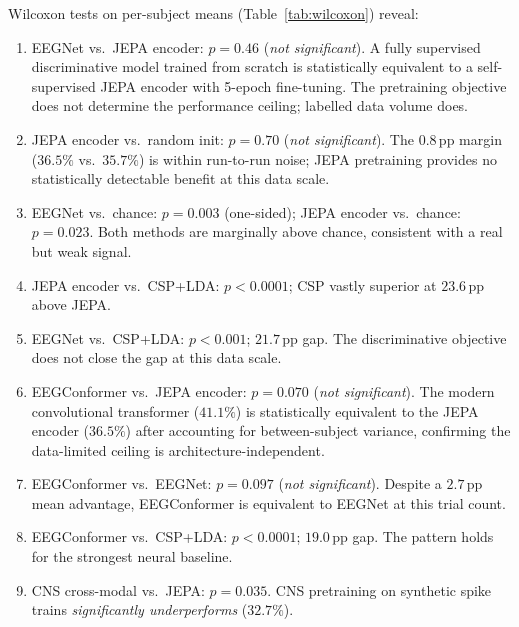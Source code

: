 \documentclass[journal]{IEEEtran}
\begin{document}
Wilcoxon tests on per-subject means (Table~\ref{tab:wilcoxon}) reveal:
\begin{enumerate}
  \item EEGNet vs.\ JEPA encoder: $p = 0.46$ (\emph{not significant}). A fully supervised discriminative model trained from scratch is statistically equivalent to a self-supervised JEPA encoder with 5-epoch fine-tuning. The pretraining objective does not determine the performance ceiling; labelled data volume does.
  \item JEPA encoder vs.\ random init: $p = 0.70$ (\emph{not significant}). The 0.8\,pp margin ($36.5\%$ vs.\ $35.7\%$) is within run-to-run noise; JEPA pretraining provides no statistically detectable benefit at this data scale.
  \item EEGNet vs.\ chance: $p = 0.003$ (one-sided); JEPA encoder vs.\ chance: $p = 0.023$. Both methods are marginally above chance, consistent with a real but weak signal.
  \item JEPA encoder vs.\ CSP+LDA: $p < 0.0001$; CSP vastly superior at $23.6$\,pp above JEPA.
  \item EEGNet vs.\ CSP+LDA: $p < 0.001$; $21.7$\,pp gap. The discriminative objective does not close the gap at this data scale.
  \item EEGConformer vs.\ JEPA encoder: $p = 0.070$ (\emph{not significant}). The modern convolutional transformer ($41.1\%$) is statistically equivalent to the JEPA encoder ($36.5\%$) after accounting for between-subject variance, confirming the data-limited ceiling is architecture-independent.
  \item EEGConformer vs.\ EEGNet: $p = 0.097$ (\emph{not significant}). Despite a $2.7$\,pp mean advantage, EEGConformer is equivalent to EEGNet at this trial count.
  \item EEGConformer vs.\ CSP+LDA: $p < 0.0001$; $19.0$\,pp gap. The pattern holds for the strongest neural baseline.
  \item CNS cross-modal vs.\ JEPA: $p = 0.035$. CNS pretraining on synthetic spike trains \emph{significantly underperforms} ($32.7\%$).
\end{enumerate}
\end{document}
